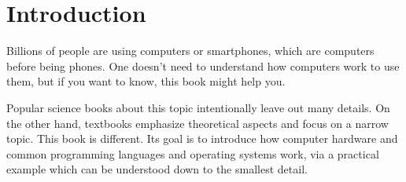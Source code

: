 \clearpage


\setcounter{tocdepth}{1}
\tableofcontents

\chapter*{Introduction}

Billions of people are using computers or smartphones, which are computers
before being phones. One doesn't need to understand how computers work to use
them, but if you want to know, this book might help you.

Popular science books about this topic intentionally leave out many details. On
the other hand, textbooks emphasize theoretical aspects and focus on a narrow
topic. This book is different. Its goal is to introduce how computer hardware
and common programming languages and operating systems work, via a practical
example which can be understood down to the smallest detail.

